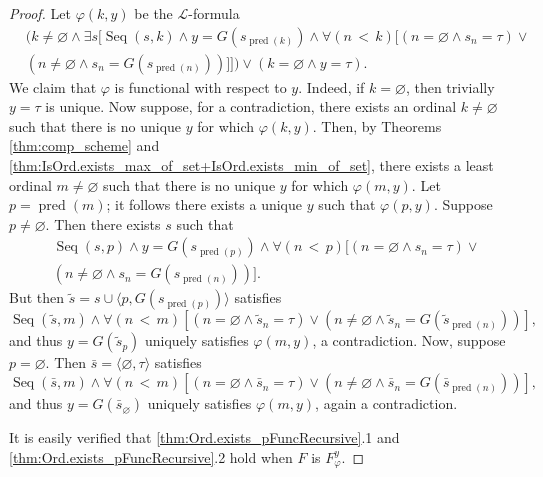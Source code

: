 \begin{proof}
    Let $\varphi(k,y)$ be the $\mathcal{L}$-formula
    \begin{equation*}
        \begin{split}
    & (k \neq \varnothing \land \exists s [\operatorname{Seq}(s,k) \land 
    y = G(s_{\operatorname{pred}(k)}) \land \forall (n\,<\,k)[(n=\varnothing \land s_n = \tau)
    \lor\\ &(n \neq \varnothing \land s_n = G(s_{\operatorname{pred}(n)}))]])
    \lor (k = \varnothing \land y = \tau).
        \end{split}
    \end{equation*}
    We claim that $\varphi$ is functional with respect to $y$.
    Indeed, if $k=\varnothing$, then trivially $y=\tau$ is unique.
    Now suppose, for a contradiction, there exists an ordinal $k\neq \varnothing$ such that there
    is no unique $y$ for which $\varphi(k,y)$. 
    Then, by Theorems \ref{thm:comp_scheme} and 
    \ref{thm:IsOrd.exists_max_of_set+IsOrd.exists_min_of_set}, there exists a
    least ordinal $m\neq\varnothing$ such that there is no unique $y$ for which $\varphi(m,y)$.
    Let $p=\operatorname{pred}(m)$; it follows there exists a unique $y$ such that $\varphi(p,y)$.
    Suppose $p\neq \varnothing$. Then there exists $s$ such that
    \begin{equation*}
        \begin{split}
    &\operatorname{Seq}(s,p) \land y = G(s_{\operatorname{pred}(p)}) \land 
    \forall (n\,<\,p)[(n=\varnothing \land s_n = \tau) \lor \\& 
    (n \neq \varnothing \land s_n = G(s_{\operatorname{pred}(n)}))].
        \end{split}
    \end{equation*}
    But then $\tilde{s} = s \cup \langle p, G(s_{\operatorname{pred}(p)}) \rangle$ satisfies
    \begin{equation*}
    \operatorname{Seq}(\tilde{s},m) \land \forall (n\,<\,m)[(n=\varnothing \land \tilde{s}_n = \tau) 
    \lor (n \neq \varnothing \land \tilde{s}_n = G(\tilde{s}_{\operatorname{pred}(n)}))], 
    \end{equation*}
    and thus $y = G(\tilde{s}_p)$ uniquely satisfies $\varphi(m,y)$, a contradiction.
    Now, suppose $p=\varnothing$. Then $\bar{s}=\langle \varnothing, \tau \rangle$ satisfies
    \begin{equation*}
        \operatorname{Seq}(\bar{s},m) \land \forall (n\,<\,m)[(n=\varnothing \land \bar{s}_n = \tau) 
        \lor (n \neq \varnothing \land \bar{s}_n = G(\bar{s}_{\operatorname{pred}(n)}))], 
    \end{equation*}
    and thus $y = G(\bar{s}_\varnothing)$ uniquely satisfies $\varphi(m,y)$, again a contradiction.
    
    It is easily verified that \ref{thm:Ord.exists_pFuncRecursive}.1 and 
    \ref{thm:Ord.exists_pFuncRecursive}.2 hold when $F$ is $F_\varphi^y$.
\end{proof}


